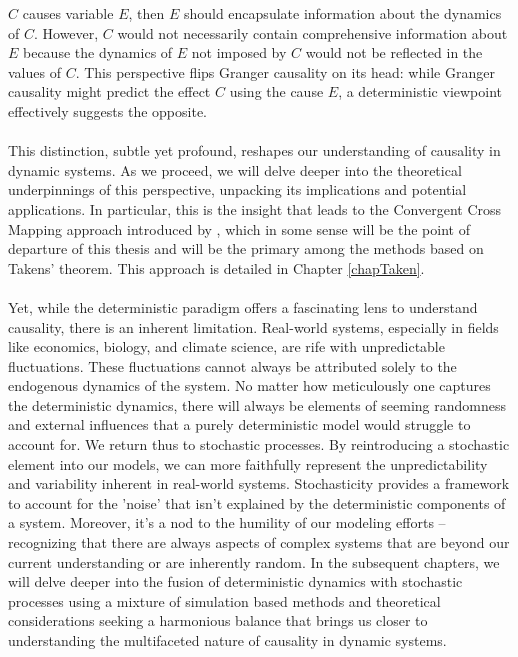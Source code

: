 \documentclass[11pt, a4paper]{memoir}
\theoremstyle{break}
\theoremstyle{break}
\theoremstyle{nonumberplain}
\begin{document}
$C$ causes variable $E$, then $E$ should encapsulate information about the dynamics of $C$. However, $C$ would not necessarily contain comprehensive information about $E$ because the dynamics of $E$ not imposed by $C$ would not be reflected in the values of $C$. This perspective flips Granger causality on its head: while Granger causality might predict the effect 
$C$ using the cause $E$, a deterministic viewpoint effectively suggests the opposite. \\\\
This distinction, subtle yet profound, reshapes our understanding of causality in dynamic systems. As we proceed, we will delve deeper into the theoretical underpinnings of this perspective, unpacking its implications and potential applications. In particular, this is the insight that leads to the Convergent Cross Mapping approach introduced by \cite{Sugihara}, which in some sense will be the point of departure of this thesis and will be the primary among the methods based on Takens' theorem. This approach is detailed in Chapter \ref{chapTaken}.\\\\
Yet, while the deterministic paradigm offers a fascinating lens to understand causality, there is an inherent limitation. Real-world systems, especially in fields like economics, biology, and climate science, are rife with unpredictable fluctuations. These fluctuations cannot always be attributed solely to the endogenous dynamics of the system. No matter how meticulously one captures the deterministic dynamics, there will always be elements of seeming randomness and external influences that a purely deterministic model would struggle to account for. We return thus to stochastic processes. By reintroducing a stochastic element into our models, we can more faithfully represent the unpredictability and variability inherent in real-world systems. Stochasticity provides a framework to account for the 'noise' that isn't explained by the deterministic components of a system. Moreover, it's a nod to the humility of our modeling efforts – recognizing that there are always aspects of complex systems that are beyond our current understanding or are inherently random. 
In the subsequent chapters, we will delve deeper into the fusion of deterministic dynamics with stochastic processes using  a mixture of simulation based methods and theoretical considerations seeking a harmonious balance that brings us closer to understanding the multifaceted nature of causality in dynamic systems.
\end{document}
